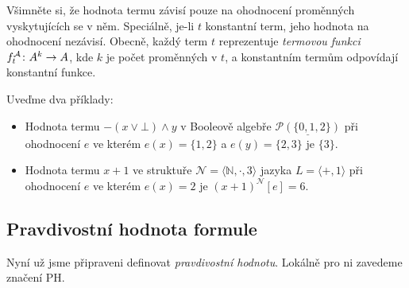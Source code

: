 \begin{remark}
    Všimněte si, že hodnota termu závisí pouze na ohodnocení proměnných vyskytujících se v něm. Speciálně, je-li $t$ konstantní term, jeho hodnota na ohodnocení nezávisí.
    Obecně, každý term $t$ reprezentuje \emph{termovou funkci} $f_t^{\mathcal{A}}\colon A^k\to A$, kde $k$ je počet proměnných v $t$, a konstantním termům odpovídají konstantní funkce.
\end{remark}

\begin{example}
    Uveďme dva příklady:
    \begin{itemize}
        \item Hodnota termu $-(x\lor \bot)\land y$ v Booleově algebře $\underline{\mathcal P(\{0,1,2\})}$ při ohodnocení $e$ ve kterém $e(x)=\{1,2\}$ a $e(y)=\{2,3\}$ je $\{3\}$.
        \item Hodnota termu $x+1$ ve struktuře $\mathcal N=\langle\mathbb N,\cdot,3\rangle$ jazyka $L=\langle +,1\rangle$ při ohodnocení $e$ ve kterém $e(x)=2$ je $(x+1)^\mathcal N[e]=6$.
    \end{itemize}
\end{example}


\subsection{Pravdivostní hodnota formule}\label{subsection:truth-value-of-formula}

Nyní už jsme připraveni definovat \emph{pravdivostní hodnotu}. Lokálně pro ni zavedeme značení $\mathrm{PH}$.

